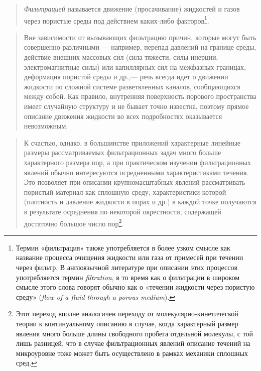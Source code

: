 \documentclass[12pt,a4paper]{article}
\newenvironment{textquote}{\begin{quote}\sloppy}{\end{quote}}
\begin{document}
\begin{textquote}
\textit{Фильтрацией} называется движение (просачивание) жидкостей и газов через пористые среды под действием каких-либо факторов\footnote{Термин «фильтрация» также употребляется в более узком смысле как название процесса очищения жидкости или газа от примесей при течении через фильтр. В англоязычной литературе при описании этих процессов употребляется термин \textit{filtration}, в то время как о фильтрации в широком смысле этого слова говорят обычно как о «течении жидкости через пористую среду» (\textit{flow of a fluid through a porous medium}).}.
\end{textquote}

\begin{textquote}
Вне зависимости от вызывающих фильтрацию причин, которые могут быть совершенно различными --- например, перепад давлений на границе среды, действие внешних массовых сил (сила тяжести, силы инерции, электромагнитные силы) или капиллярных сил на межфазных границах, деформация пористой среды и др.,--- речь всегда идет о движении жидкости по сложной системе разветвленных каналов, сообщающихся между собой. Как правило, внутренняя поверхность порового пространства имеет случайную структуру и не бывает точно известна, поэтому прямое описание движения жидкости во всех подробностях оказывается невозможным.
\end{textquote}

\begin{textquote}
К счастью, однако, в большинстве приложений характерные линейные размеры рассматриваемых фильтрационных задач
много больше характерного размера пор, а при практическом изучении фильтрационных явлений обычно интересуются осредненными характеристиками течения. Это позволяет при описании крупномасштабных явлений рассматривать пористый материал как сплошную среду, характеристики которой (плотность и давление жидкости в порах и др.) в каждой точке получаются в результате осреднения по некоторой окрестности, содержащей достаточно большое число пор\footnote{Этот переход вполне аналогичен переходу от молекулярно-кинетической теории к континуальному описанию в случае, когда характерный размер явления много больше длины свободного пробега отдельной молекулы, с той лишь разницей, что в случае фильтрационных явлений описание течений на микроуровне тоже может быть осуществлено в рамках механики сплошных сред.}.
\end{textquote}
\end{document}
